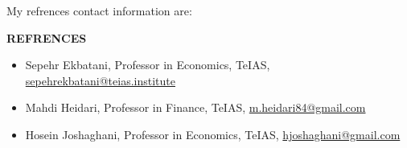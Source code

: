 \documentclass[]{letter}
\begin{document}
My refrences contact information are:

\par

\textbf{REFRENCES}
\begin{itemize}
    \item Sepehr Ekbatani, Professor in Economics, TeIAS, \href{mailto: sepehrekbatani@teias.institute}{sepehrekbatani@teias.institute}
    \item Mahdi Heidari, Professor in Finance, TeIAS, \href{mailto: m.heidari84@gmail.com}{m.heidari84@gmail.com}
    \item Hosein Joshaghani, Professor in Economics, TeIAS, \href{mailto: hjoshaghani@gmail.com}{hjoshaghani@gmail.com}
\end{itemize}
\end{document}
